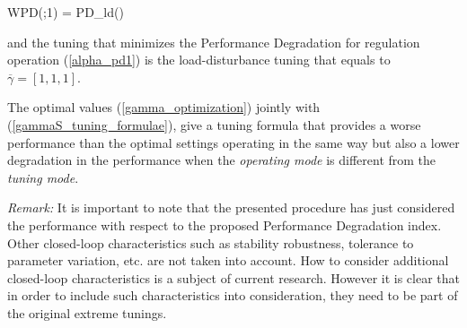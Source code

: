\be WPD(\overline{\gamma};1) = PD_{ld}(\overline{\gamma})
\label{alpha_pd1} \ee

\noindent and the tuning that minimizes the Performance
Degradation for regulation operation (\ref{alpha_pd1}) is the
load-disturbance tuning that equals to
$\overline{\gamma}=[1,1,1]$.

The optimal values (\ref{gamma_optimization}) jointly with
(\ref{gammaS_tuning_formulae}), give a tuning formula that
provides a worse performance than the optimal settings operating
in the same way but also a lower degradation in the performance
when the \emph{operating mode} is different from the \emph{tuning
mode}.

\emph{Remark:} It is important to note that the presented
procedure has just considered the performance with respect to the
proposed Performance Degradation index. Other closed-loop
characteristics such as stability robustness, tolerance to
parameter variation, etc. are not taken into account. How to
consider additional closed-loop characteristics is a subject of
current research. However it is clear that in order to include
such characteristics into consideration, they need to be part of
the original extreme tunings.
